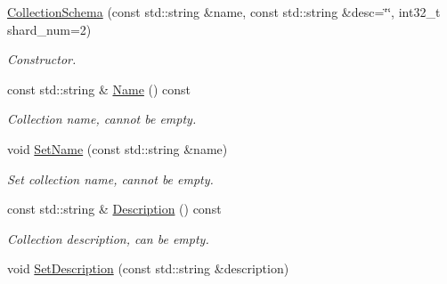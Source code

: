 \begin{DoxyCompactItemize}
\item 
\mbox{\label{classmilvus_1_1_collection_schema_aa80b3f460e7356b76eae642918ae8f07}} 
\hyperlink{classmilvus_1_1_collection_schema_aa80b3f460e7356b76eae642918ae8f07}{Collection\+Schema} (const std\+::string \&name, const std\+::string \&desc=\char`\"{}\char`\"{}, int32\+\_\+t shard\+\_\+num=2)
\begin{DoxyCompactList}\small\item\em Constructor. \end{DoxyCompactList}\item 
\mbox{\label{classmilvus_1_1_collection_schema_ad53e007042cc09ecb321e7adca70148f}} 
const std\+::string \& \hyperlink{classmilvus_1_1_collection_schema_ad53e007042cc09ecb321e7adca70148f}{Name} () const
\begin{DoxyCompactList}\small\item\em Collection name, cannot be empty. \end{DoxyCompactList}\item 
\mbox{\label{classmilvus_1_1_collection_schema_aab99e07591c2dc4a64b20d32bc260a85}} 
void \hyperlink{classmilvus_1_1_collection_schema_aab99e07591c2dc4a64b20d32bc260a85}{Set\+Name} (const std\+::string \&name)
\begin{DoxyCompactList}\small\item\em Set collection name, cannot be empty. \end{DoxyCompactList}\item 
\mbox{\label{classmilvus_1_1_collection_schema_ae8a43e75b2f9c2820a8513d752174e4a}} 
const std\+::string \& \hyperlink{classmilvus_1_1_collection_schema_ae8a43e75b2f9c2820a8513d752174e4a}{Description} () const
\begin{DoxyCompactList}\small\item\em Collection description, can be empty. \end{DoxyCompactList}\item 
\mbox{\label{classmilvus_1_1_collection_schema_a7796f8d75d54ec07d69f69cd861b5a4a}} 
void \hyperlink{classmilvus_1_1_collection_schema_a7796f8d75d54ec07d69f69cd861b5a4a}{Set\+Description} (const std\+::string \&description)

\end{DoxyCompactItemize}
